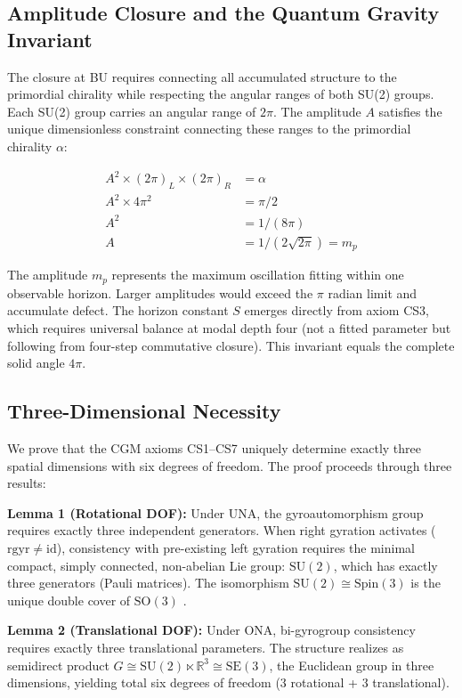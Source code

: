 \documentclass[11pt,a4paper]{article}
\theoremstyle{definition}
\theoremstyle{remark}
\begin{document}
\subsection{Amplitude Closure and the Quantum Gravity Invariant}

The closure at BU requires connecting all accumulated structure to the primordial chirality while respecting the angular ranges of both SU(2) groups. Each SU(2) group carries an angular range of $2\pi$. The amplitude $A$ satisfies the unique dimensionless constraint connecting these ranges to the primordial chirality $\alpha$:

\begin{align}
A^2 \times (2\pi)_L \times (2\pi)_R &= \alpha \\
A^2 \times 4\pi^2 &= \pi/2 \\
A^2 &= 1/(8\pi) \\
A &= 1/(2\sqrt{2\pi}) = m_p
\end{align}

The amplitude $m_p$ represents the maximum oscillation fitting within one observable horizon. Larger amplitudes would exceed the $\pi$ radian limit and accumulate defect. The horizon constant $S$ emerges directly from axiom CS3, which requires universal balance at modal depth four (not a fitted parameter but following from four-step commutative closure). This invariant equals the complete solid angle $4\pi$.

\subsection{Three-Dimensional Necessity}

We prove that the CGM axioms CS1--CS7 uniquely determine exactly three spatial dimensions with six degrees of freedom. The proof proceeds through three results:

\textbf{Lemma 1 (Rotational DOF):} Under UNA, the gyroautomorphism group requires exactly three independent generators. When right gyration activates ($\mathrm{rgyr} \neq \mathrm{id}$), consistency with pre-existing left gyration requires the minimal compact, simply connected, non-abelian Lie group: $\mathrm{SU}(2)$, which has exactly three generators (Pauli matrices). The isomorphism $\mathrm{SU}(2) \cong \mathrm{Spin}(3)$ is the unique double cover of $\mathrm{SO}(3)$ \cite{Hall2015,Sakurai1994}.

\textbf{Lemma 2 (Translational DOF):} Under ONA, bi-gyrogroup consistency requires exactly three translational parameters. The structure realizes as semidirect product $G \cong \mathrm{SU}(2) \ltimes \mathbb{R}^3 \cong \mathrm{SE}(3)$, the Euclidean group in three dimensions, yielding total six degrees of freedom (3 rotational + 3 translational).
\end{document}

